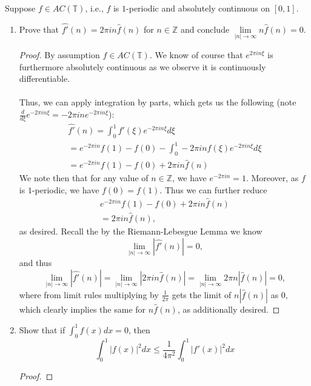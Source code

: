 \documentclass[12pt]{article}
\newenvironment{ex}[2][Exercise]{\begin{trivlist}
\item[\hskip \labelsep {\bfseries #1}\hskip \labelsep {\bfseries #2.}]}{\end{trivlist}}
\begin{document}
\begin{ex}{6}
    Suppose $f \in AC(\mathbb{T})$, i.e., $f$ is $1$-periodic and absolutely continuous on $[0,1]$.
    \begin{enumerate}[label=6.\arabic*]
        \item Prove that $\hat{f'}(n) = 2\pi in\hat{f}(n)$ for $n \in \mathbb{Z}$ and conclude $\underset{|n| \rightarrow \infty}{\lim} n\hat{f}(n) = 0$.
        \begin{proof}
            By assumption $f \in AC(\mathbb{T})$. We know of course that $e^{2\pi in\xi}$ is furthermore absolutely continuous as we observe it is continuously differentiable. \\ \\
            Thus, we can apply integration by parts, which gets us the following (note $\frac{d}{d\xi} e^{-2\pi in\xi} = -2\pi ine^{-2\pi in\xi}$):
            \begin{align*}
                \hat{f'}(n) = \int_0^1 f'(\xi) e^{-2\pi i n\xi} d\xi \\
                = e^{-2\pi in}f(1) - f(0) - \int_0^1 -2\pi in f(\xi)e^{-2\pi in \xi} d\xi \\
                = e^{-2\pi in}f(1) - f(0) + 2\pi i n \hat{f}(n)
            \end{align*}
            We note then that for any value of $n \in \mathbb{Z}$, we have $e^{-2\pi in} = 1$. Moreover, as $f$ is $1$-periodic, we have $f(0) = f(1)$. Thus we can further reduce 
            \begin{align*}
                e^{-2\pi in}f(1) - f(0) + 2\pi i n \hat{f}(n) \\
                = 2\pi in\hat{f}(n),
            \end{align*}
            as desired. Recall the by the Riemann-Lebesgue Lemma we know 
            $$\underset{|n| \rightarrow \infty}{\lim} |\hat{f'}(n)| = 0,$$
            and thus 
            $$\underset{|n| \rightarrow \infty}{\lim} |\hat{f'}(n)| = \underset{|n| \rightarrow \infty}{\lim} |2\pi i n \hat{f}(n)| = \underset{|n| \rightarrow \infty}{\lim} 2\pi n |\hat{f}(n)| = 0,$$
            where from limit rules multiplying by $\frac{1}{2\pi}$ gets the limit of $n|\hat{f}(n)|$ as $0$, which clearly implies the same for $n\hat{f}(n)$, as additionally desired.
        \end{proof}
        \item Show that if $\int_0^1 f(x) dx = 0$, then 
        $$\int_0^1 |f(x)|^2 dx \leq \frac{1}{4\pi^2} \int_0^1 |f'(x)|^2 dx$$
        \begin{proof}

\end{proof}
\end{enumerate}
\end{ex}
\end{document}
